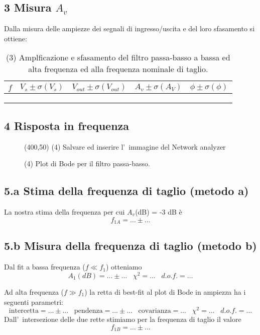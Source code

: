 \documentclass[10pt,a4paper]{article}
\newcommand{\exn}{\phantom{xxx}}
\begin{document}
\subsection*{3 Misura $A_v$}
Dalla misura delle ampiezze dei segnali di ingresso/uscita e del loro sfasamento si ottiene:
\begin{table}[h]
\centering
\begin{tabular}{|c|c|c|c|c|}
\hline 
$f$ & $V_s \pm \sigma(V_s)$  & $V_{out} \pm \sigma(V_{out})$ & $A_v \pm \sigma(A_V)$ & $\phi \pm \sigma(\phi)$ \\
\hline 
\exn & \exn & \exn & \exn & \exn  \\
\exn & \exn & \exn & \exn & \exn  \\
\exn & \exn & \exn & \exn & \exn  \\
\hline 
\end{tabular} 
\caption{(3) Amplficazione e sfasamento del filtro passa-basso a bassa ed alta frequenza ed alla frequenza nominale di taglio.
\label{tab:par1}}
\end{table}

\subsection*{4 Risposta in frequenza}
\begin{figure}[h]
\centering
\framebox(400,50){ (4) Salvare ed inserire l'~immagine del Network analyzer}
\caption{(4) Plot di Bode per il filtro passa-basso.}
\end{figure}

\subsection*{5.a Stima della frequenza di taglio (metodo a)}
La nostra stima della frequenza per cui $A_v$(dB) = -3 dB \`e
\[
f_{1A} = \ldots\pm \ldots
\]

\subsection*{5.b Misura della frequenza di taglio (metodo b)}
Dal fit a bassa frequenza ($f\ll f_1$) otteniamo
\[
A_1(dB) = \ldots\pm \ldots\;\;\; \chi^2 = \ldots\;\;\; d.o.f. = \ldots
\]

Ad alta frequenza ($f \gg f_1$) la retta di best-fit al plot di Bode in ampiezza ha i seguenti parametri:
\[
\mathrm{intercetta} = \ldots\pm \ldots\;\;\;\mathrm{pendenza}= \ldots\pm \ldots\;\;\;\mathrm{covarianza} 
= \ldots\;\;\;\chi^2 = \ldots\;\;\; d.o.f. = \ldots
\]
Dall'~intersezione delle due rette stimiamo per la frequenza di taglio il valore
\[
f_{1B} = \ldots\pm \ldots
\]
\end{document}
